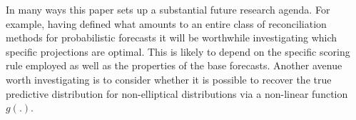\documentclass[12pt]{article}
\theoremstyle{definition}
\begin{document}
In many ways this paper sets up a substantial future research agenda. For example, having defined what amounts to an entire class of reconciliation methods for probabilistic forecasts it will be worthwhile investigating which specific projections are optimal. This is likely to depend on the specific scoring rule employed as well as the properties of the base forecasts. Another avenue worth investigating is to consider whether it is possible to recover the true predictive distribution for non-elliptical distributions via a non-linear function $g(.)$.




\newpage




\end{document}
